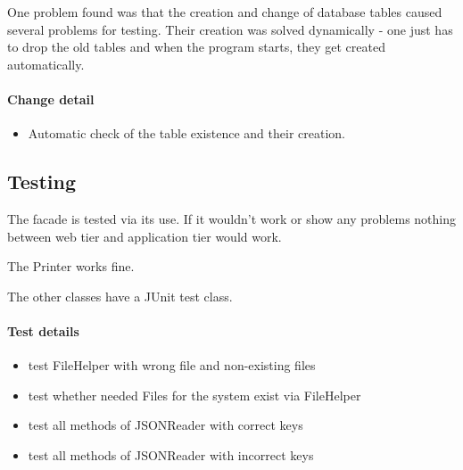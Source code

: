 One problem found was that the creation and change of database tables caused several problems
for testing. Their creation was solved dynamically - one just has to drop the old tables and when the program starts, they get created automatically.

\paragraph{Change detail}
\begin{itemize}
  \item Automatic check of the table existence and their creation.
\end{itemize}


\subsection{Testing}
The facade is tested via its use. If it wouldn't work or show any problems
nothing between web tier and application tier would work.

The Printer works fine.

The other classes have a JUnit test class.
\paragraph{Test details}
\begin{itemize}
  \item test FileHelper with wrong file and non-existing files
  \item test whether needed Files for the system exist via FileHelper
  \item test all methods of JSONReader with correct keys
  \item test all methods of JSONReader with incorrect keys
\end{itemize}




